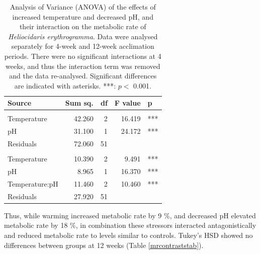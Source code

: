 \documentclass[a4paper,10pt, oneside]{memoir}
\begin{document}
\begin{table}[tb]

\caption[Analysis of Variance (ANOVA) of the effects of increased temperature and decreased pH, and their interaction on the metabolic rate of \emph{Heliocidaris erythrogramma}.]{\label{mranovatab}Analysis of Variance (ANOVA) of the effects of increased temperature and decreased pH, and their interaction on the metabolic rate of \emph{Heliocidaris erythrogramma}. Data were analysed separately for 4-week and 12-week acclimation periods. There were no significant interactions at 4 weeks, and thus the interaction term was removed and the data re-analysed. Significant differences are indicated with asterisks. ***: \(p <\) 0.001.}
\centering
\begin{tabular}[t]{lrrrl}
\toprule
Source & Sum sq. & df & F value & p \\
\midrule
\addlinespace[0.3em]
\multicolumn{5}{l}{\textit{4 weeks}}\\
\hspace{1em}Temperature & 42.260 & 2 & 16.419 & ***\\
\hspace{1em}pH & 31.100 & 1 & 24.172 & ***\\
\hspace{1em}Residuals & 72.060 & 51 &  & \\
\addlinespace[0.3em]
\multicolumn{5}{l}{\textit{12 weeks}}\\
\hspace{1em}Temperature & 10.390 & 2 & 9.491 & ***\\
\hspace{1em}pH & 8.965 & 1 & 16.370 & ***\\
\hspace{1em}Temperature:pH & 11.460 & 2 & 10.460 & ***\\
\hspace{1em}Residuals & 27.920 & 51 &  & \\
\bottomrule
\end{tabular}
\end{table}

Thus, while warming increased metabolic rate by 9 \%, and decreased pH elevated metabolic rate by 18 \%, in combination these stressors interacted antagonistically and reduced metabolic rate to levels similar to controls. Tukey's HSD showed no differences between groups at 12 weeks (Table \ref{mrcontraststab}).
\end{document}
